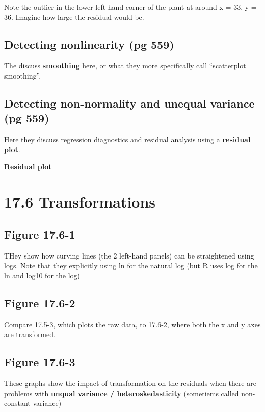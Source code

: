 \documentclass[]{book}
\theoremstyle{definition}
\theoremstyle{definition}
\theoremstyle{definition}
\theoremstyle{remark}
\begin{document}
Note the outlier in the lower left hand corner of the plant at around x
= 33, y = 36. Imagine how large the residual would be.

\subsection{Detecting nonlinearity (pg
559)}\label{detecting-nonlinearity-pg-559}

The discuss \textbf{smoothing} here, or what they more specifically call
``scatterplot smoothing''.

\subsection{Detecting non-normality and unequal variance (pg
559)}\label{detecting-non-normality-and-unequal-variance-pg-559}

Here they discuss regression diagnostics and residual analysis using a
\textbf{residual plot}.

\textbf{Residual plot}

\section{17.6 Transformations}\label{transformations}

\subsection{Figure 17.6-1}\label{figure-17.6-1}

THey show how curving lines (the 2 left-hand panels) can be straightened
using logs. Note that they explicitly using ln for the natural log (but
R uses log for the ln and log10 for the log)

\subsection{Figure 17.6-2}\label{figure-17.6-2}

Compare 17.5-3, which plots the raw data, to 17.6-2, where both the x
and y axes are transformed.

\subsection{Figure 17.6-3}\label{figure-17.6-3}

These graphs show the impact of transformation on the residuals when
there are problems with \textbf{unqual variance / heteroskedasticity}
(sometiems called non-constant variance)
\end{document}
